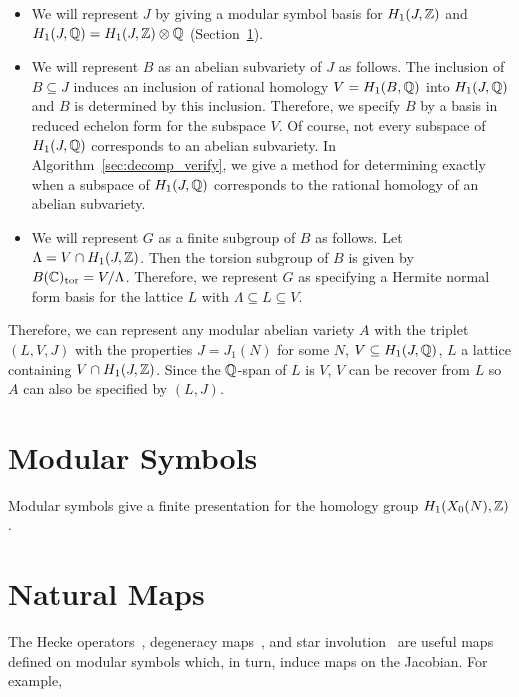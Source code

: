 \documentclass[11pt, proquest]{uwthesis}
\begin{document}
\begin{itemize}
    \item
        We will represent $J$ by giving a modular
        symbol basis for $H_1(J, \mathbb{Z})$ and $H_1(J, \mathbb{Q}) = H_1(J, \mathbb{Z})\otimes
        \mathbb{Q}$ (Section~\ref{sec:modular_symbols}).
    \item
        We will represent $B$ as an abelian subvariety of $J$ as follows. The
        inclusion of $B\subseteq J$ induces an inclusion of rational homology
        $V=H_1(B, \mathbb{Q})$ into $H_1(J, \mathbb{Q})$ and $B$ is determined by this
        inclusion. Therefore, we specify $B$ by a basis in reduced echelon form
        for the subspace $V$. Of course, not every subspace of $H_1(J, \mathbb{Q})$
        corresponds to an abelian subvariety. In
        Algorithm~\ref{sec:decomp_verify}, we give a method for determining
        exactly when a subspace of $H_1(J, \mathbb{Q})$ corresponds to the rational
        homology of an abelian subvariety.
    \item
        We will represent $G$ as a finite subgroup of $B$ as follows. Let
        $\Lambda=V\cap H_1(J, \mathbb{Z})$. Then the torsion subgroup of $B$ is given
        by $B(\mathbb{C})_{\mathrm{tor}}=V/\Lambda$. Therefore, we represent $G$ as specifying a
        Hermite normal form basis for the lattice $L$ with $\Lambda \subseteq L
        \subseteq V$.
\end{itemize}

Therefore, we can represent any modular abelian variety $A$ with the triplet
$(L, V, J)$ with the properties $J=J_1(N)$ for some $N$, $V\subseteq H_1(J,
\mathbb{Q})$, $L$ a lattice containing $V\cap H_1(J, \mathbb{Z})$. Since the $\mathbb{Q}$-span of
$L$ is $V$, $V$ can be recover from $L$ so $A$ can also be specified by $(L,
J)$.

\section{Modular Symbols}
\label{sec:modular_symbols}

Modular symbols give a finite presentation for the homology group $H_1(X_0(N),
\mathbb{Z})$.

\section{Natural Maps}%
\label{sec:alg_natural_maps}
The Hecke operators~\cite[\S 8.3]{stein:modform}, degeneracy maps~\cite[\S
8.6]{stein:modform}, and star involution~\cite[\S 8.5]{stein:modform} are
useful maps defined on modular symbols which, in turn, induce maps on the
Jacobian. For example, %
\end{document}

